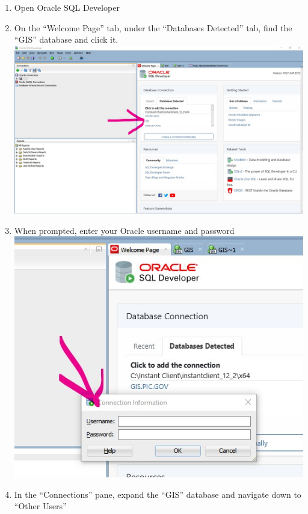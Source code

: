 \documentclass[]{book}
\providecommand{\tightlist}{%
  \setlength{\itemsep}{0pt}\setlength{\parskip}{0pt}}
\begin{document}
\begin{enumerate}
\def\labelenumi{\arabic{enumi}.}
\tightlist
\item
  Open Oracle SQL Developer
\item
  On the ``Welcome Page'' tab, under the ``Databases Detected'' tab, find the ``GIS'' database and click it.
  \includegraphics{images/SQL_Dev_Screenshot_1.jpg}
\item
  When prompted, enter your Oracle username and password
  \includegraphics{images/SQL_Dev_Screenshot_2.jpg}
\item
  In the ``Connections'' pane, expand the ``GIS'' database and navigate down to ``Other Users''

\end{enumerate}
\end{document}
